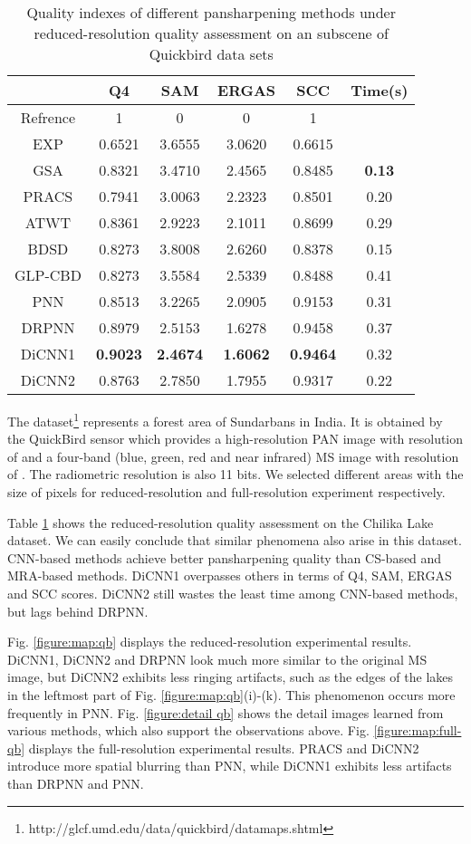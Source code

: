 \documentclass[journal]{IEEEtran}
\begin{document}
\begin{table}[htp]
\small
\caption{Quality indexes of different pansharpening methods under reduced-resolution quality assessment on an  subscene of Quickbird data sets}
\centering
\begin{tabular}{c|ccccc}
\hline
{}&Q4&SAM& ERGAS &SCC&Time(s)\\
\hline
Refrence&1 &0 &0 &1&{}\\
\hline
\hline
EXP &0.6521 &3.6555 &3.0620 &0.6615 &{}\\
\hline
GSA&0.8321 &3.4710 &2.4565 &0.8485 &\textbf{0.13}\\
\hline
PRACS&0.7941 &3.0063 &2.2323 &0.8501 &0.20\\
\hline
ATWT&0.8361 &2.9223 &2.1011 &0.8699 &0.29\\
\hline
BDSD&0.8273 &3.8008 &2.6260 &0.8378 &0.15\\
\hline
GLP-CBD&0.8273 &3.5584 &2.5339 &0.8488 &0.41\\
\hline
\hline
PNN &0.8513 &3.2265 &2.0905 &0.9153 &0.31\\
\hline
DRPNN &0.8979 &2.5153 &1.6278 &0.9458 &0.37\\
\hline
DiCNN1 &\textbf{0.9023} &\textbf{2.4674} &\textbf{1.6062} &\textbf{0.9464} &0.32\\
\hline
DiCNN2 &0.8763 &2.7850 &1.7955 &0.9317&0.22\\
\hline
\end{tabular}
\label{table:reduceqb}
\end{table}

The dataset\footnote{http://glcf.umd.edu/data/quickbird/datamaps.shtml} represents a forest area of Sundarbans in India. It is obtained by the QuickBird sensor which provides a high-resolution PAN image with resolution of  and a four-band (blue, green, red and near infrared) MS image with resolution of . The radiometric resolution is also 11 bits. We selected different areas with the size of  pixels for reduced-resolution and full-resolution experiment respectively.

Table \ref{table:reduceqb} shows the reduced-resolution quality assessment on the Chilika Lake dataset. We can easily conclude that similar phenomena also arise in this dataset. CNN-based methods achieve better pansharpening quality than CS-based and MRA-based methods. DiCNN1 overpasses others in terms of Q4, SAM, ERGAS and SCC scores. DiCNN2 still wastes the least time among CNN-based methods, but lags behind DRPNN.

Fig. \ref{figure:map:qb} displays the reduced-resolution experimental results. DiCNN1, DiCNN2 and DRPNN look much more similar to the original MS image, but DiCNN2 exhibits less ringing artifacts, such as the edges of the lakes in the leftmost part of Fig. \ref{figure:map:qb}(i)-(k). This phenomenon occurs more frequently in PNN. Fig. \ref{figure:detail qb} shows the detail images learned from various methods, which also support the observations above. Fig. \ref{figure:map:full-qb} displays the full-resolution experimental results. PRACS and DiCNN2 introduce more spatial blurring than PNN, while DiCNN1 exhibits less artifacts than DRPNN and PNN.
\end{document}
